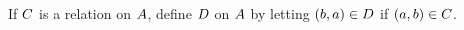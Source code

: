 \documentclass[../main.tex]{subfiles}
\begin{document}
\problem{}\label{s3p14}

If \({C}\) is a relation on \({A}\), define
\({D}\) on \({A}\) by letting
\(({b},{a}) \in {D}\) if
\(({a},{b}) \in {C}\).




\end{document}
